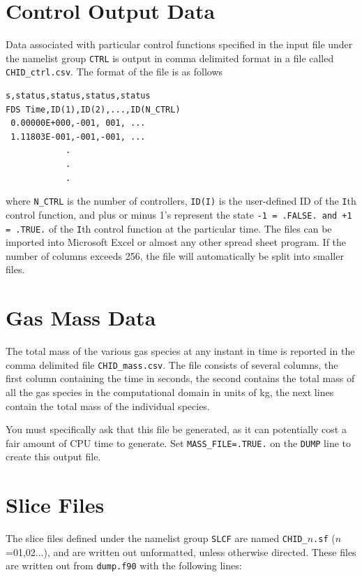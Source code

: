 \documentclass[11pt]{book}
\newcommand{\ct}{\tt\small}
\begin{document}
\section{Control Output Data}
\label{out:CTRL}

Data associated with particular control functions specified in the input file under the
namelist group {\ct CTRL} is output in comma delimited format in a file called
{\ct CHID\_ctrl.csv}. The format of the file is as follows

\footnotesize
\begin{verbatim}
s,status,status,status,status
FDS Time,ID(1),ID(2),...,ID(N_CTRL)
 0.00000E+000,-001, 001, ...
 1.11803E-001,-001,-001, ...
            .
            .
            .

\end{verbatim}
\normalsize

\noindent
where {\ct N\_CTRL} is the number of controllers, {\ct ID(I)} is the user-defined ID of the {\ct I}th control function, and plus or minus 1's represent the
state {\ct -1 = .FALSE. and +1 = .TRUE.} of the {\ct I}th control function at the particular time.
The files can be imported into Microsoft Excel or almost any other
spread sheet program. If the number of columns exceeds 256, the file will automatically be split into smaller files.


\section{Gas Mass Data}

The total mass of the various gas species at any instant in time
is reported in the comma delimited
file {\ct CHID\_mass.csv}. The file consists of several columns,
the first column containing the time in seconds, the second contains the
total mass of all the gas species in the computational domain in units of kg,
the next lines contain the total mass of the individual species.

You must specifically ask that this file be generated, as it can potentially cost a fair amount of CPU time to generate. Set
{\ct MASS\_FILE=.TRUE.} on the {\ct DUMP} line to create this output file.


\section{Slice Files}
\label{out:SLCF}
The slice files defined under the namelist group {\ct SLCF} are
named {\ct CHID\_$n$.sf} ($n$=01,02...),
and are written out unformatted, unless otherwise directed.
These files are written out from {\ct dump.f90} with the following lines:
\end{document}
